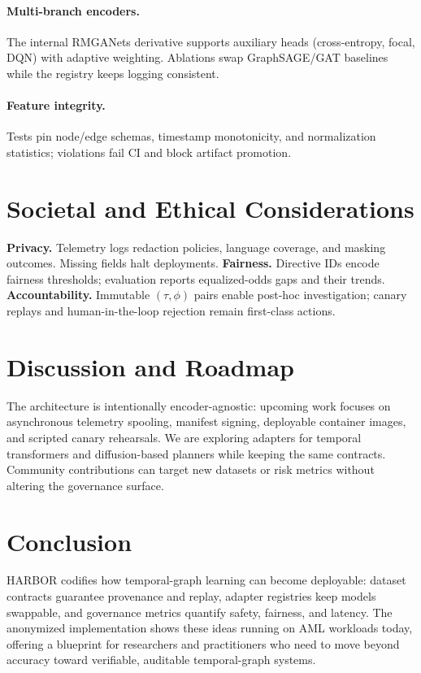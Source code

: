 \documentclass[letterpaper]{article}
\begin{document}
\paragraph{Multi-branch encoders.} The internal RMGANets derivative supports auxiliary heads (cross-entropy, focal, DQN) with adaptive weighting. Ablations swap GraphSAGE/GAT baselines while the registry keeps logging consistent.
\paragraph{Feature integrity.} Tests pin node/edge schemas, timestamp monotonicity, and normalization statistics; violations fail CI and block artifact promotion.

\section{Societal and Ethical Considerations}
\label{sec:ethics}
\textbf{Privacy.} Telemetry logs redaction policies, language coverage, and masking outcomes. Missing fields halt deployments.
\textbf{Fairness.} Directive IDs encode fairness thresholds; evaluation reports equalized-odds gaps and their trends.
\textbf{Accountability.} Immutable $(\tau,\phi)$ pairs enable post-hoc investigation; canary replays and human-in-the-loop rejection remain first-class actions.

\section{Discussion and Roadmap}
\label{sec:discussion}
The architecture is intentionally encoder-agnostic: upcoming work focuses on asynchronous telemetry spooling, manifest signing, deployable container images, and scripted canary rehearsals. We are exploring adapters for temporal transformers and diffusion-based planners while keeping the same contracts. Community contributions can target new datasets or risk metrics without altering the governance surface.

\section{Conclusion}
\label{sec:conclusion}
\textsc{HARBOR} codifies how temporal-graph learning can become deployable: dataset contracts guarantee provenance and replay, adapter registries keep models swappable, and governance metrics quantify safety, fairness, and latency. The anonymized implementation shows these ideas running on AML workloads today, offering a blueprint for researchers and practitioners who need to move beyond accuracy toward verifiable, auditable temporal-graph systems.



\end{document}

